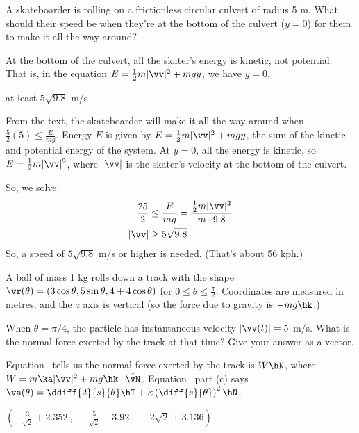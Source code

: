 \begin{question}
	A skateboarder is rolling on a frictionless circular culvert of radius 5 m. What should their speed be when they're at the bottom of the culvert ($y=0$) for them to make it all the way around?
	
\end{question}
\begin{hint}
	At the bottom of the culvert, all the skater's energy is kinetic, not potential. That is, in the equation $E=\frac12m|\vv|^2+mgy$, we have $y=0$.
\end{hint}
\begin{answer}
	at least $5\sqrt{9.8}$ m/s
\end{answer}
\begin{solution}
	From the text, the skateboarder will make it all the way around when $\frac{5}{2}(5)
	\le\frac{E}{mg}$. Energy $E$ is given by $E=\frac12m|\vv|^2+mgy$, the sum of the kinetic and potential energy of the system. At $y=0$, all the energy is kinetic, so $E=\frac12m|\vv|^2$, where $|\vv|$ is the skater's velocity at the bottom of the culvert.
	
	So, we solve:
	\begin{align*}
		\frac{25}{2}&\le\frac{E}{mg}=\frac{\frac12m|\vv|^2}{m\cdot9.8}\\
		|\vv|&\ge5\sqrt{9.8}
	\end{align*}
	So, a speed of $5\sqrt{9.8}$ m/s or higher is needed. (That's about 56 kph.)
\end{solution}
\begin{question}
A ball of mass 1 kg rolls down a  track with the shape $\vr(\theta)=(3 \cos \theta, 5\sin\theta, 4+4\cos\theta)$ for $0 \le \theta \le \frac{\pi}{2}$.  Coordinates are measured in metres, and the $z$ axis is vertical (so the force due to gravity is $-mg\hk$.)

 When $\theta=\pi/4$, the particle has instantaneous velocity $|\vv(t)|=5$ m/s. What is the normal force exerted by the track at that time? Give your answer as a vector.
\end{question}
\begin{hint}
Equation~ tells us the normal force exerted by the track is $W\hN$, where
$W=m\ka|\vv|^2+mg\hk\cdot \hat\vN
$. Equation~ part (c) says $\va(\theta)=\ddiff{2}{s}{\theta}\hT+\kappa\left(\diff{s}{\theta}\right)^2\hN$.
\end{hint}
\begin{answer}
$\left( -\frac{3}{\sqrt2}+2.352~,~-\frac{5}{\sqrt 2}+{3.92}~,~-{2\sqrt 2}+3.136\right)
$
\end{answer}
